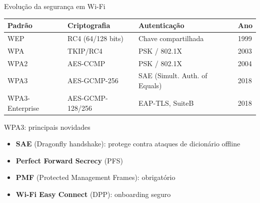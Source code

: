 \documentclass[aspectratio=169,11pt]{beamer}
\begin{document}
\begin{frame}{Evolução da segurança em Wi-Fi}
  \begin{center}
    \scriptsize
    \begin{tabular}{@{}llll@{}}
      \toprule
      \textbf{Padrão} & \textbf{Criptografia} & \textbf{Autenticação} & \textbf{Ano}\\
      \midrule
      WEP & RC4 (64/128 bits) & Chave compartilhada & 1999\\
      WPA & TKIP/RC4 & PSK / 802.1X & 2003\\
      WPA2 & AES-CCMP & PSK / 802.1X & 2004\\
      WPA3 & AES-GCMP-256 & SAE (Simult. Auth. of Equals) & 2018\\
      WPA3-Enterprise & AES-GCMP-128/256 & EAP-TLS, SuiteB & 2018\\
      \bottomrule
    \end{tabular}
  \end{center}
  \begin{block}{WPA3: principais novidades}
    \begin{itemize}
      \item \textbf{SAE} (Dragonfly handshake): protege contra ataques de dicionário offline
      \item \textbf{Perfect Forward Secrecy} (PFS)
      \item \textbf{PMF} (Protected Management Frames): obrigatório
      \item \textbf{Wi-Fi Easy Connect} (DPP): onboarding seguro
    \end{itemize}
  \end{block}
\end{frame}
\end{document}
